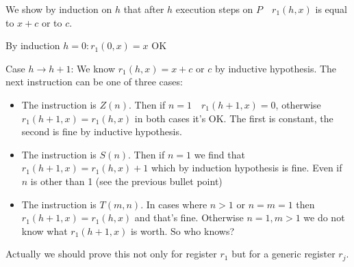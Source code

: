 We show by induction on $h$ that after $h$ execution steps on $P \quad  r_1(h,x) $ is equal to $x + c$ or to $c$.

By induction $h = 0: r_1(0,x) = x $ OK

Case $ h \rightarrow h+1 $: We know $ r_1(h,x) = x+c $ or $ c $ by inductive hypothesis. The next instruction can be one of three cases:
\begin{itemize}
\item The instruction is $Z (n)$. Then if $n = 1  \quad  r_1(h+1,x) = 0 $, otherwise $ r_1(h+1,x) = r_1(h,x) $ in both cases it's OK. The first is constant, the second is fine by inductive hypothesis.
\item The instruction is $S (n)$. Then if $n = 1$ we find that $ r_1(h+1,x) = r_1(h,x)+1 $ which by induction hypothesis is fine. Even if $n$ is other than 1 (see the previous bullet point)
\item The instruction is $T (m, n)$. In cases where $ n>1 $ or $ n=m=1 $ then $ r_1(h+1,x) = r_1(h,x) $ and that's fine. Otherwise $ n = 1, m > 1 $ we do not know what $ r_1(h+1,x) $ is worth. So who knows?
\end{itemize}

Actually we should prove this not only for register $ r_1 $ but for a generic
register $ r_j $.
